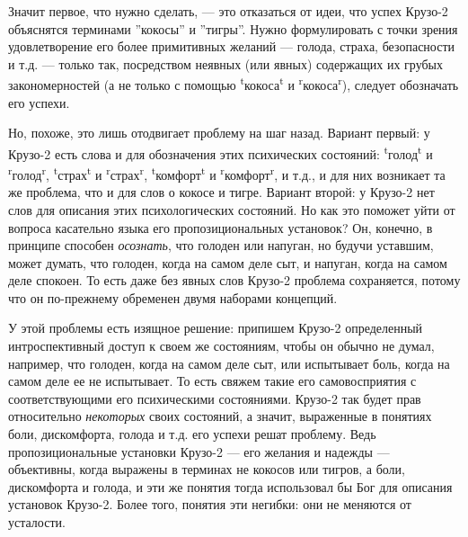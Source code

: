 \documentclass[11pt]{book}
\begin{document}
Значит первое, что нужно сделать, --- это отказаться от идеи, что успех Крузо-2 объяснятся терминами ''кокосы'' и ''тигры''. Нужно формулировать с точки зрения удовлетворение его более примитивных желаний --- голода, страха, безопасности и т.д. --- только так, посредством неявных (или явных) содержащих их грубых закономерностей (а не только с помощью \textsuperscript{t}кокоса\textsuperscript{t} и \textsuperscript{r}кокоса\textsuperscript{r}), следует обозначать его успехи.

Но, похоже, это лишь отодвигает проблему на шаг назад. Вариант первый: у Крузо-2 есть слова и для обозначения этих психических состояний: \textsuperscript{t}голод\textsuperscript{t} и \textsuperscript{r}голод\textsuperscript{r}, \textsuperscript{t}страх\textsuperscript{t} и \textsuperscript{r}страх\textsuperscript{r}, \textsuperscript{t}комфорт\textsuperscript{t} и \textsuperscript{r}комфорт\textsuperscript{r}, и т.д., и для них возникает та же проблема, что и для слов о кокосе и тигре. Вариант второй: у Крузо-2 нет слов для описания этих психологических состояний. Но как это поможет уйти от вопроса касательно языка его пропозициональных установок? Он, конечно, в принципе способен \textit{осознать}, что голоден или напуган, но будучи уставшим, может думать, что голоден, когда на самом деле сыт, и напуган, когда на самом деле спокоен. То есть даже без явных слов Крузо-2 проблема сохраняется, потому что он по-прежнему обременен двумя наборами концепций.

У этой проблемы есть изящное решение: припишем Крузо-2 определенный интроспективный доступ к своем же состояниям, чтобы он обычно не думал, например, что голоден, когда на самом деле сыт, или испытывает боль, когда на самом деле ее не испытывает. То есть свяжем такие его самовосприятия с соответствующими его психическими состояниями. Крузо-2 так будет прав относительно \textit{некоторых} своих состояний, а значит, выраженные в понятиях боли, дискомфорта, голода и т.д. его успехи решат проблему. Ведь пропозициональные установки Крузо-2 --- его желания и надежды --- объективны, когда выражены в терминах не кокосов или тигров, а боли, дискомфорта и голода, и эти же понятия тогда использовал бы Бог для описания установок Крузо-2. Более того, понятия эти негибки: они не меняются от усталости.
\end{document}
